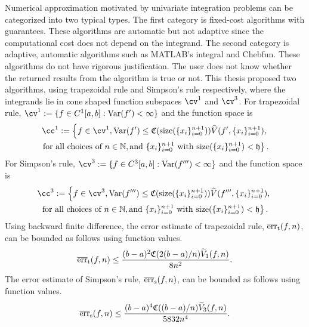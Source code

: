\documentclass{iitthesis}
\DeclareMathOperator{\Var}{Var}
\theoremstyle{definition}
\theoremstyle{remark}
\begin{document}
Numerical approximation motivated by univariate integration problems can be categorized into two typical types. The first category is fixed-cost algorithms with guarantees. These algorithms are automatic but not adaptive since the computational cost does not depend on the integrand. The second category is adaptive, automatic algorithms such as MATLAB's integral and Chebfun. These algorithms do not have rigorous justification. The user does not know whether the returned results from the algorithm is true or not. This thesis proposed two algorithms, using trapezoidal rule and Simpson's rule respectively, where the integrands lie in cone shaped function subspaces $\cv^1$ and $\cv^3$. For trapezoidal rule, $\cv^{1}:=\{f\in C^{1}[a,b]: \Var(f') < \infty \}$ and the function space is
\begin{multline*}
\cc^{1}:=\left\{f\in \cv^{1}, \Var(f')\leq \mathfrak{C}(\text{size}(\{x_i\}_{i=0}^{n+1}))\widehat{V}(f',\{x_i\}_{i=0}^{n+1}),\right.\\ \left.\text{for all choices of } n\in \mathbb{N}, \text{and }\{x_i\}_{i=0}^{n+1} \text{ with }\text{size}(\{x_i\}_{i=0}^{n+1})<\mathfrak{h}\right\}.
\end{multline*}
 For Simpson's rule, $\cv^{3}:=\{f\in C^{3}[a,b]: \Var(f''') < \infty \}$ and the function space is
 \begin{multline*}
\cc^{3}:=\left\{f\in \cv^{3}, \Var(f''')\leq \mathfrak{C}(\text{size}(\{x_i\}_{i=0}^{n+1}))\widehat{V}(f''',\{x_i\}_{i=0}^{n+1}),\right.\\ \left.\text{for all choices of } n\in \mathbb{N}, \text{and }\{x_i\}_{i=0}^{n+1} \text{ with }\text{size}(\{x_i\}_{i=0}^{n+1})<\mathfrak{h}\right\}.
\end{multline*}
  Using backward finite difference, the error estimate of trapezoidal rule, $\overline{\textup{err}}_{\textup{t}}(f,n)$, can be bounded as follows using function values.
 \begin{equation*}
   \overline{\textup{err}}_{\textup{t}}(f,n)\leq \frac{(b-a)^2\mathfrak{C}(2(b-a)/n)\widetilde{V}_1(f,n)}{8n^2}.
 \end{equation*}
The error estimate of Simpson's rule, $\overline{\textup{err}}_{\textup{s}}(f,n)$, can be bounded as follows using function values.
\begin{equation*}
  \overline{\textup{err}}_{\text{s}}(f,n)\leq \frac{(b-a)^4\mathfrak{C}((b-a)/n)\widetilde{V}_3(f,n)}{5832n^4}.
\end{equation*}
\end{document}
